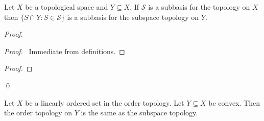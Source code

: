 \begin{lm}
  \label{lm:topology:subspace:subbasis}
  Let $X$ be a topological space and $Y \subseteq X$. If $\mathcal{S}$ is a
  subbasis for the topology on $X$ then $\{ S \cap Y : S \in \mathcal{S} \}$
  is
  a subbasis for the subspace topology on $Y$.
\end{lm}

\begin{proof}
  \pf
  \begin{proof}
    \pf\ Immediate from definitions.
  \end{proof}
  \begin{proof}
  \end{proof}
  \qed
\end{proof}

\begin{thm}
  Let $X$ be a linearly ordered set in the order topology. Let $Y \subseteq
  X$
  be convex. Then the order topology on $Y$ is the same as the subspace
  topology.
\end{thm}

